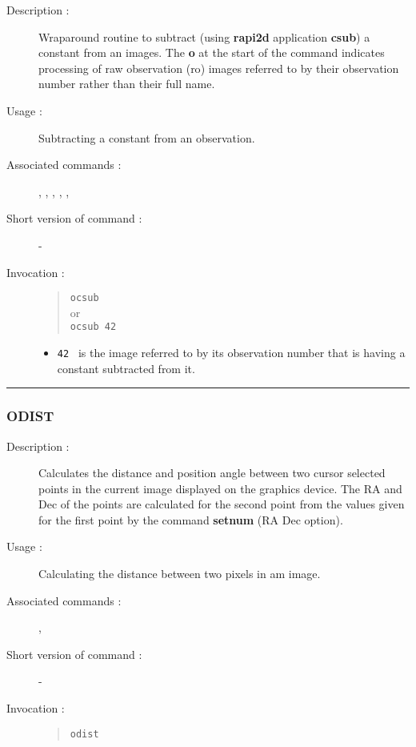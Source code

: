 \begin{description}

\item[Description :] Wraparound routine to subtract (using {\bf rapi2d}
application {\bf csub}) a constant from an images. The {\bf o} at the
start of the command indicates processing of raw observation ({\sc ro})
images referred to by their observation number rather than their full
name.

\item[Usage :] Subtracting a constant from an observation.

\item[Associated commands :] {\tt {}},
{\tt {}}, {\tt {}},
{\tt {}}, {\tt {}},
{\tt {}}

\item[Short version of command :] -
\item[Invocation :]

\begin{quote}{\tt  ocsub }\\
or \\
{\tt ocsub 42 }
\end{quote}

\begin{itemize}

\item {\tt 42 } is the image referred to by its observation number that
  is having a constant subtracted from it.
\end{itemize}

\end{description}

\hrule
\subsubsection*{\label{ODIST}ODIST}

\begin{description}

\item[Description :] Calculates the distance and position angle between
two cursor selected points in the current image displayed on the
graphics device.  The RA and Dec of the points are calculated for the
second point from the values given for the first point by the command
{\bf setnum} (RA Dec option).

\item[Usage :] Calculating the distance between two pixels in am image.
\item[Associated commands :] {\tt {}},
{\tt {}}
\item[Short version of command :] -
\item[Invocation :]

\begin{quote}{\tt  odist }\end{quote}

\end{description}

